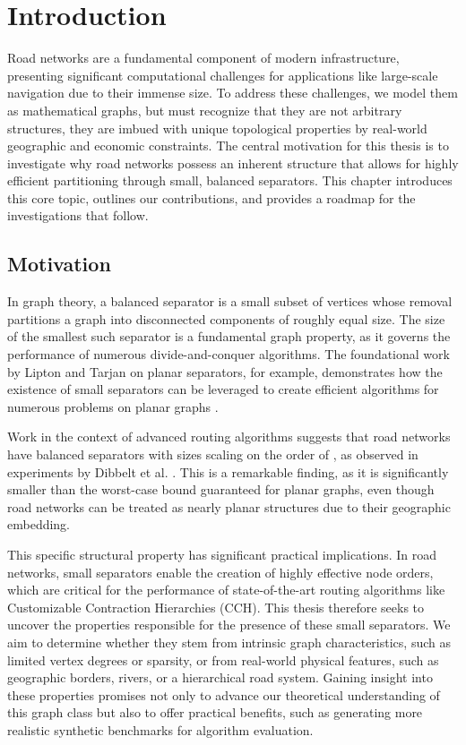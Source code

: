 \chapter{Introduction}
\label{ch:introduction}

Road networks are a fundamental component of modern infrastructure, presenting significant computational challenges for applications like large-scale navigation due to their immense size.
To address these challenges, we model them as mathematical graphs, but must recognize that they are not arbitrary structures, they are imbued with unique topological properties by real-world geographic and economic constraints.
The central motivation for this thesis is to investigate why road networks possess an inherent structure that allows for highly efficient partitioning through small, balanced separators.
This chapter introduces this core topic, outlines our contributions, and provides a roadmap for the investigations that follow.

\section{Motivation}
\label{sec:motivation}

In graph theory, a balanced separator is a small subset of vertices whose removal partitions a graph into disconnected components of roughly equal size.
The size of the smallest such separator is a fundamental graph property, as it governs the performance of numerous divide-and-conquer algorithms.
The foundational work by Lipton and Tarjan on planar separators, for example, demonstrates how the existence of small separators can be leveraged to create efficient algorithms for numerous problems on planar graphs \cite{lipton_applications_1977, lipton_separator_1979}.

Work in the context of advanced routing algorithms suggests that road networks have balanced separators with sizes scaling on the order of , as observed in experiments by Dibbelt et al. \cite{dibbelt_customizable_2016}.
This is a remarkable finding, as it is significantly smaller than the  worst-case bound guaranteed for planar graphs, even though road networks can be treated as nearly planar structures due to their geographic embedding.

This specific structural property has significant practical implications.
In road networks, small separators enable the creation of highly effective node orders, which are critical for the performance of state-of-the-art routing algorithms like Customizable Contraction Hierarchies (CCH).
This thesis therefore seeks to uncover the properties responsible for the presence of these small separators.
We aim to determine whether they stem from intrinsic graph characteristics, such as limited vertex degrees or sparsity, or from real-world physical features, such as geographic borders, rivers, or a hierarchical road system.
Gaining insight into these properties promises not only to advance our theoretical understanding of this graph class but also to offer practical benefits, such as generating more realistic synthetic benchmarks for algorithm evaluation.

